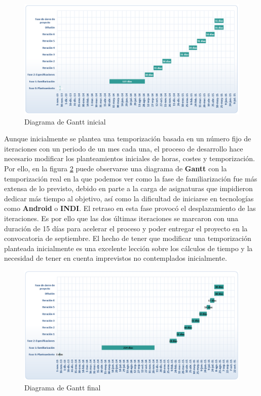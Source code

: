 \begin{figure}[!ht]
  \begin{center}
  \includegraphics[width=1\textwidth]{../images/gantt_ideal.png}
  \caption{Diagrama de Gantt inicial}
  \label{fig:diag_gantt_inicial}
  \end{center}
\end{figure}

\bigskip
Aunque inicialmente se plantea una temporización basada en un número fijo de iteraciones con un periodo de un mes cada una, el proceso de desarrollo hace necesario modificar los planteamientos iniciales de horas, costes y temporización. Por ello, en la figura \ref{fig:diag_gantt_final} puede observarse una diagrama de \textbf{Gantt} con la temporización real en la que podemos ver como la fase de familiarización fue más extensa de lo previsto, debido en parte a la carga de asignaturas que impidieron dedicar más tiempo al objetivo, así como la dificultad de iniciarse en tecnologías como \textbf{Android} o \textbf{INDI}. El retraso en esta fase provocó el desplazamiento de las iteraciones. Es por ello que las dos últimas iteraciones se marcaron con una duración de 15 días para acelerar el proceso y poder entregar el proyecto en la convocatoria de septiembre. El hecho de tener que modificar una temporización planteada inicialmente es una excelente lección sobre los cálculos de tiempo y la necesidad de tener en cuenta imprevistos no contemplados inicialmente. 

\begin{figure}[!ht]
  \begin{center}
  \includegraphics[width=1\textwidth]{../images/gantt_real.png}
  \caption{Diagrama de Gantt final}
  \label{fig:diag_gantt_final}
  \end{center}
\end{figure}

